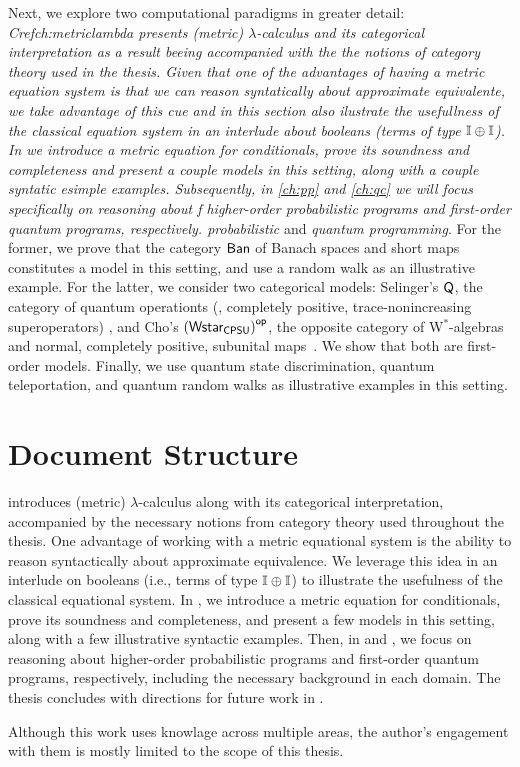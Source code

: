 Next, we explore two computational paradigms in greater detail: \emph{Cref{ch:metriclambda} presents (metric) $\lambda$-calculus and its categorical interpretation as a result beeing accompanied with the  the notions of category theory used in the thesis. Given that one of the advantages of having a metric equation system is that we can reason syntatically about approximate equivalente, we take advantage of this cue and in this section also ilustrate the usefullness of the classical equation system in an interlude about booleans (\ie terms of type $ \mathbb{I} \oplus \mathbb{I} $). In  we introduce  a metric equation for conditionals, prove its soundness and completeness and present a couple models in this setting, along with a couple syntatic esimple examples. Subsequently, in \autoref{ch:pp} and \autoref{ch:qc}  we will focus specifically on reasoning about f higher-order probabilistic programs and first-order quantum programs, respectively. probabilistic} and \emph{quantum programming}. For the former, we prove that the category $ \mathsf{Ban} $ of Banach spaces and short maps constitutes a model in this setting, and use a random walk as an illustrative example. For the latter, we consider two categorical models: Selinger’s \( \mathsf{Q} \), the category of quantum operationts (\ie, completely positive, trace-nonincreasing superoperators) \cite{selinger2004towards}, and Cho’s \( \left(\mathsf{Wstar_{CPSU}}\right)^{\mathsf{op}} \), the opposite category of W$^*$-algebras and normal, completely positive, subunital maps~\cite{choSemanticsQuantumProgramming2016}. We show that both are first-order models. Finally, we use quantum state discrimination, quantum teleportation, and quantum random walks as illustrative examples in this setting.




\section{Document Structure}

 introduces (metric) $\lambda$-calculus along with its categorical interpretation, accompanied by the necessary notions from category theory used throughout the thesis. One advantage of working with a metric equational system is the ability to reason syntactically about approximate equivalence. We leverage this idea in an interlude on booleans (i.e., terms of type $\mathbb{I} \oplus \mathbb{I}$) to illustrate the usefulness of the classical equational system. In , we introduce a metric equation for conditionals, prove its soundness and completeness, and present a few models in this setting, along with a few illustrative syntactic examples. Then, in  and , we focus on reasoning about higher-order probabilistic programs and first-order quantum programs, respectively,  including the necessary background in each domain. The thesis concludes with directions for future work in .

Although this work uses knowlage across multiple areas, the author's engagement with them is mostly limited to the scope of this thesis.


